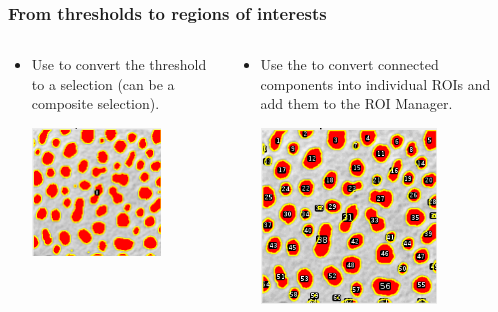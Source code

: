\documentclass[ignorenonframetext,aspectratio=169,10pt,xcolor=table]{beamer}
\begin{document}
\begin{frame} \frametitle{From thresholds to regions of interests}
    \begin{columns}
      \begin{column}{0.5\textwidth}
    \begin{itemize}
    \item Use  to convert the
      threshold to a selection (can be a composite selection).
      \begin{center}
      \includegraphics[width=0.7\textwidth]{threshold2selection}
      \end{center}
    \end{itemize}
  \end{column}
  \begin{column}{0.5\textwidth}
    \begin{itemize}
      \item Use the  to convert
      connected components into individual ROIs and add them to the ROI
      Manager.
      \begin{center}
        \includegraphics[width=0.7\textwidth]{thresholdroimanager}

\end{center}
\end{itemize}
\end{column}
\end{columns}
\end{frame}
\end{document}
